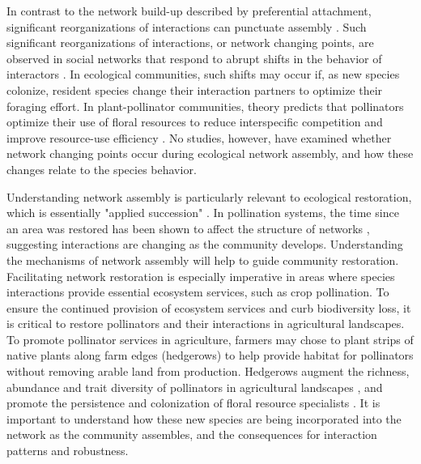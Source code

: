 \documentclass[12pt]{article}
\begin{document}
In contrast to the network build-up described by preferential
attachment, significant reorganizations of interactions can punctuate
assembly \citep{peel2014detecting}. Such significant reorganizations
of interactions, or network changing points, are observed in social
networks that respond to abrupt shifts in the behavior of interactors
\citep{peel2014detecting}. In ecological communities, such shifts may
occur if, as new species colonize, resident species change their
interaction partners to optimize their foraging effort. In
plant-pollinator communities, theory predicts that pollinators
optimize their use of floral resources to reduce interspecific
competition and improve resource-use efficiency
\citep{pyke1984optimal, valdovinos2010consequences,
  valdovinos2013adaptive, albrecht2010plant, Bluthgen2007}. No
studies, however, have examined whether network changing points occur
during ecological network assembly, and how these changes relate to
the species behavior.

Understanding network assembly is particularly relevant to ecological
restoration, which is essentially "applied succession"
\citep[e.g.,][]{parker1997scale}. In pollination systems, the time
since an area was restored has been shown to affect the structure of
networks \citep{forup-2008-742, devoto2012understanding}, suggesting
interactions are changing as the community develops. Understanding the
mechanisms of network assembly will help to guide community
restoration. Facilitating network restoration is especially imperative
in areas where species interactions provide essential ecosystem
services, such as crop pollination. To ensure the continued provision
of ecosystem services and curb biodiversity loss, it is critical to
restore pollinators and their interactions in agricultural
landscapes. To promote pollinator services in agriculture, farmers may
chose to plant strips of native plants along farm edges (hedgerows) to
help provide habitat for pollinators without removing arable land from
production. Hedgerows augment the richness, abundance and trait
diversity of pollinators in agricultural landscapes
\citep{morandin-2013-829, kremen-2015-602, ponisio2015farm}, and
promote the persistence and colonization of floral resource
specialists \citep{mgonigle-2015-x}. It is important to understand how
these new species are being incorporated into the network as the
community assembles, and the consequences for interaction patterns and
robustness.
\end{document}
